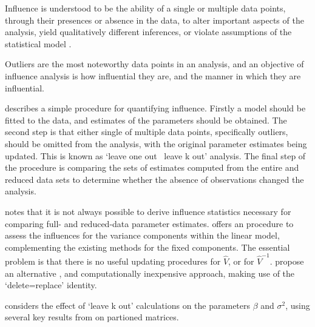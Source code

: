 \documentclass[Chap5amain.tex]{subfiles}
\begin{document}
 Influence is understood to be the ability of a single or multiple
 data points, through their presences or absence in the data, to
 alter important aspects of the analysis, yield qualitatively
 different inferences, or violate assumptions of the statistical
 model \citep{schabenberger}.
 
 Outliers are the most noteworthy data points in an analysis, and
 an objective of influence analysis is how influential they are,
 and the manner in which they are influential.
 
 \citet{schabenberger} describes a simple procedure for quantifying
 influence. Firstly a model should be fitted to the data, and
 estimates of the parameters should be obtained. The second step is
 that either single of multiple data points, specifically outliers,
 should be omitted from the analysis, with the original parameter
 estimates being updated. This is known as `leave one out \ leave k
 out' analysis. The final step of the procedure is comparing the
 sets of estimates computed from the entire and reduced data sets
 to determine whether the absence of observations changed the
 analysis.
 
 
 
% 
 \citet{schabenberger} notes that it is not always possible to
 derive influence statistics necessary for comparing full- and
 reduced-data parameter estimates. \citet{HaslettDillane} offers an
 procedure to assess the influences for the variance components
 within the linear model, complementing the existing methods for
 the fixed components. The essential problem is that there is no
 useful updating procedures for $\hat{V}$, or for $\hat{V}^{-1}$.
 \citet{HaslettDillane} propose an alternative , and
 computationally inexpensive approach, making use of the
 `delete=replace' identity.
 
 \citet{Haslett99} considers the effect of `leave k out'
 calculations on the parameters $\beta$ and $\sigma^{2}$, using
 several key results from \citet{HaslettHayes} on partioned
 matrices.
 
 
 
\end{document}
